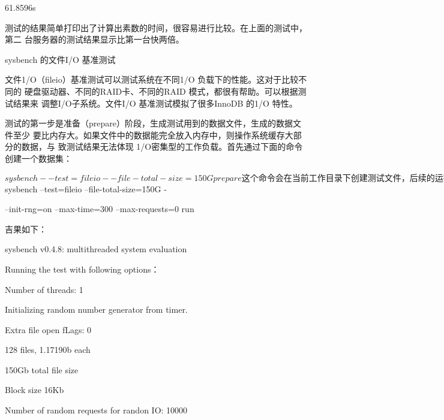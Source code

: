 61.8596s

测试的结果简单打印出了计算出素数的时间，很容易进行比较。在上面的测试中，第二
台服务器的测试结果显示比第一台快两倍。

sysbench 的文件I/O 基准测试

文件1/O（fileio）基准测试可以测试系统在不同1/O 负载下的性能。这对于比较不同的
硬盘驱动器、不同的RAID卡、不同的RAID 模式，都很有帮助。可以根据测试结果来
调整I/O子系统。文件I/O 基准测试模拟了很多InnoDB 的1/O 特性。

测试的第一步是准备（prepare）阶段，生成测试用到的数据文件，生成的数据文件至少
要比内存大。如果文件中的数据能完全放入内存中，则操作系统缓存大部分的数据，与
致测试结果无法体现 1/O密集型的工作负载。首先通过下面的命令创建一个数据集：

$ sysbench --test=fileio --file-total-size=150G prepare

这个命令会在当前工作目录下创建测试文件，后续的运行（run）阶段将通过读写这些文
件进行测试。第二步就是运行（run）阶段，针对不同的I/O 类型有不同的测试选项：

seqwr

顺序写人。

seqrewr

顺序重写。

eqrd

ndrd

ndwr

dnrw

顺序读取。

随机读取。

随机写人。

混合随机读/写。

下面的命令运行文件1/0混合随机读/ 写基准测试：
$ sysbench --test=fileio --file-total-size=150G -

--init-rng=on --max-time=300 --max-requests=0 run

吉果如下：

sysbench v0.4.8: multithreaded system evaluation

Running the test with following options：

Number of threads: 1

Initializing random number generator from timer.

Extra file open fLags: 0

128 files, 1.17190b each

150Gb total file size

Block size 16Kb

Number of random requests for randon IO: 10000

